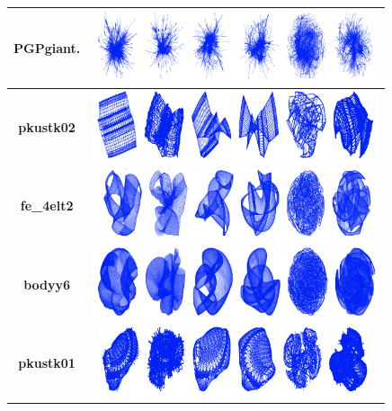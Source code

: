 \documentclass[conference]{article}
\begin{document}
\begin{table}[htbp]
\begin{tabular}{|c|p{1.2cm}|p{1.4cm}|p{1.2cm}|p{1.4cm}|p{1.2cm}|p{1.2cm}|}
\textbf{PGPgiant.}        & \multicolumn{6}{c|}{\includegraphics[height=2.05cm,width=0.8\linewidth]{layouts/PGPgiantcompo.png}}                                                                                                                 \\ \hline
\textbf{pkustk02}        & \multicolumn{6}{c|}{\includegraphics[height=2.05cm,width=0.8\linewidth]{layouts/pkustk02.png}}                                                                                                                 \\ \hline
\textbf{fe\_4elt2}        & \multicolumn{6}{c|}{\includegraphics[height=2.05cm,width=0.8\linewidth]{layouts/fe_4elt2.png}}                                                                                                                 \\ \hline
\textbf{bodyy6}        & \multicolumn{6}{c|}{\includegraphics[height=2.05cm,width=0.8\linewidth]{layouts/bodyy6.png}}                                                                                                                 \\ \hline

\textbf{pkustk01}        & \multicolumn{6}{c|}{\includegraphics[height=2.05cm,width=0.8\linewidth]{layouts/pkustk01.png}}  \\ \hline

\end{tabular}
\end{table}
\end{document}
